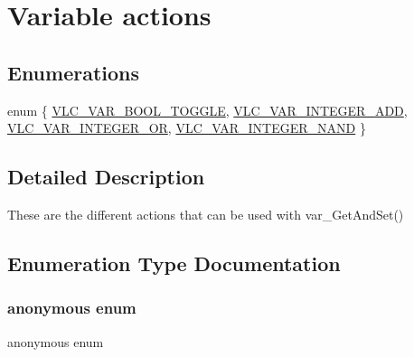 \hypertarget{group__var__GetAndSet}{}\section{Variable actions}
\label{group__var__GetAndSet}
\subsection*{Enumerations}
\begin{DoxyCompactItemize}
\item 
enum \{ \hyperlink{group__var__GetAndSet_gga78372742882dccd1c13323dbd66c25c5a52a2736f59edc0b370c102606299b382}{V\+L\+C\+\_\+\+V\+A\+R\+\_\+\+B\+O\+O\+L\+\_\+\+T\+O\+G\+G\+LE}, 
\hyperlink{group__var__GetAndSet_gga78372742882dccd1c13323dbd66c25c5abc3538003d11e6b39b31809d58f3a1c2}{V\+L\+C\+\_\+\+V\+A\+R\+\_\+\+I\+N\+T\+E\+G\+E\+R\+\_\+\+A\+DD}, 
\hyperlink{group__var__GetAndSet_gga78372742882dccd1c13323dbd66c25c5a3fcd3914189b5d143a816b070e56c3bc}{V\+L\+C\+\_\+\+V\+A\+R\+\_\+\+I\+N\+T\+E\+G\+E\+R\+\_\+\+OR}, 
\hyperlink{group__var__GetAndSet_gga78372742882dccd1c13323dbd66c25c5ab04fc2819637ad817c3d1dc57d96f758}{V\+L\+C\+\_\+\+V\+A\+R\+\_\+\+I\+N\+T\+E\+G\+E\+R\+\_\+\+N\+A\+ND}
 \}
\end{DoxyCompactItemize}


\subsection{Detailed Description}
These are the different actions that can be used with var\+\_\+\+Get\+And\+Set() 

\subsection{Enumeration Type Documentation}
\mbox{\label{group__var__GetAndSet_ga78372742882dccd1c13323dbd66c25c5}} 
\subsubsection{\texorpdfstring{anonymous enum}{anonymous enum}}
{\footnotesize\ttfamily anonymous enum}

